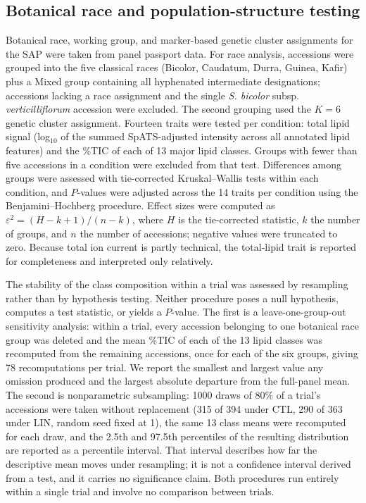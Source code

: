 \documentclass[9pt,twocolumn,twoside]{rilabRxiv}
\begin{document}
\subsection*{Botanical race and population-structure testing}

Botanical race, working group, and marker-based genetic cluster assignments for the SAP were taken from panel passport data. For race analysis, accessions were grouped into the five classical races (Bicolor, Caudatum, Durra, Guinea, Kafir) plus a Mixed group containing all hyphenated intermediate designations; accessions lacking a race assignment and the single \textit{S. bicolor} subsp. \textit{verticilliflorum} accession were excluded. The second grouping used the $K=6$ genetic cluster assignment. Fourteen traits were tested per condition: total lipid signal (log$_{10}$ of the summed SpATS-adjusted intensity across all annotated lipid features) and the \%TIC of each of 13 major lipid classes. Groups with fewer than five accessions in a condition were excluded from that test. Differences among groups were assessed with tie-corrected Kruskal--Wallis tests within each condition, and $P$-values were adjusted across the 14 traits per condition using the Benjamini--Hochberg procedure. Effect sizes were computed as $\varepsilon^2=(H-k+1)/(n-k)$, where $H$ is the tie-corrected statistic, $k$ the number of groups, and $n$ the number of accessions; negative values were truncated to zero. Because total ion current is partly technical, the total-lipid trait is reported for completeness and interpreted only relatively.

The stability of the class composition within a trial was assessed by resampling rather than by hypothesis testing. Neither procedure poses a null hypothesis, computes a test statistic, or yields a $P$-value. The first is a leave-one-group-out sensitivity analysis: within a trial, every accession belonging to one botanical race group was deleted and the mean \%TIC of each of the 13 lipid classes was recomputed from the remaining accessions, once for each of the six groups, giving 78 recomputations per trial. We report the smallest and largest value any omission produced and the largest absolute departure from the full-panel mean. The second is nonparametric subsampling: 1000 draws of 80\% of a trial's accessions were taken without replacement (315 of 394 under CTL, 290 of 363 under LIN, random seed fixed at 1), the same 13 class means were recomputed for each draw, and the 2.5th and 97.5th percentiles of the resulting distribution are reported as a percentile interval. That interval describes how far the descriptive mean moves under resampling; it is not a confidence interval derived from a test, and it carries no significance claim. Both procedures run entirely within a single trial and involve no comparison between trials.
\end{document}

